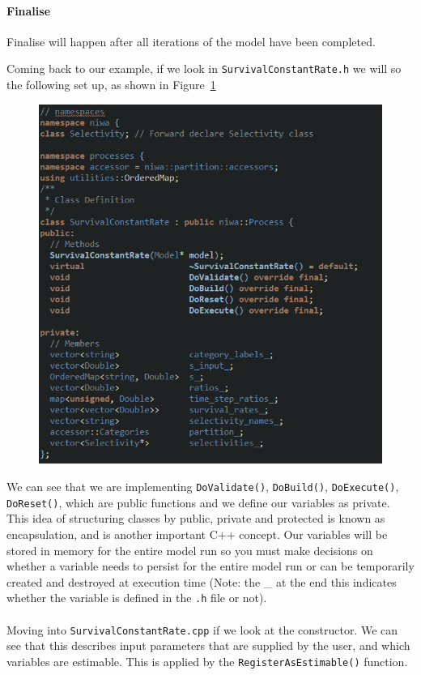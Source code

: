 \paragraph*{Finalise}
Finalise will happen after all iterations of the model have been completed.
\pagebreak


Coming back to our example, if we look in \texttt{SurvivalConstantRate.h} we will so the following set up, as shown in Figure~\ref{fig:process_h}

\begin{figure}[!ht]
	\centering
	\includegraphics[scale=0.6]{Figures/process_h.png}
	\caption{}\label{fig:process_h}
\end{figure}

We can see that we are implementing \texttt{DoValidate()}, \texttt{DoBuild()}, \texttt{DoExecute()}, \texttt{DoReset()}, which are public functions and we define our variables as private. This idea of structuring classes by public, private and protected is known as encapsulation, and is another important C++ concept. Our variables will be stored in memory for the entire model run so you must make decisions on whether a variable needs to persist for the entire model run or can be temporarily created and destroyed at execution time (Note: the \_ at the end this indicates whether the variable is defined in the \texttt{.h} file or not). 
\\\\
Moving into \texttt{SurvivalConstantRate.cpp} if we look at the constructor. We can see that this describes input parameters that are supplied by the user, and which variables are estimable. This is applied by the \texttt{RegisterAsEstimable()} function.

